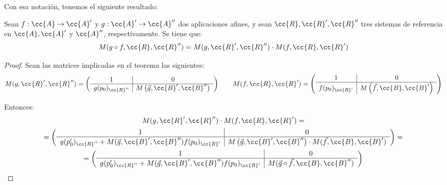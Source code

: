 Con esa notación, tenemos el siguiente resultado:
\begin{teo}
    Sean $f:\cc{A}\to \cc{A}'$ y $g:\cc{A}'\to \cc{A}''$ dos aplicaciones afines, y sean $\cc{R}, \cc{R}', \cc{R}''$ tres sistemas de referencia en $\cc{A},\cc{A}'$ y $\cc{A}''$, respectivamente. Se tiene que:
    \begin{equation*}
        M(g\circ f, \cc{R}, \cc{R}'')
        = M(g,\cc{R}', \cc{R}'')\cdot
        M(f,\cc{R}, \cc{R}')
    \end{equation*}
\end{teo}
\begin{proof}
    Sean las matrices implicadas en el teorema las siguientes:
    \begin{equation*}
        M(g,\cc{R}',\cc{R}'')=\left(\begin{array}{c|c}
            1 & 0 \\ \hline
            g(p_0)_{\cc{R}''} &  M\left(\vec{g},\cc{B}',\cc{B}''\right)  \\
        \end{array}\right)\qquad
        M(f,\cc{R},\cc{R}')=\left(\begin{array}{c|c}
            1 & 0 \\ \hline
            f(p_0)_{\cc{R}'} &  M\left(\vec{f},\cc{B},\cc{B}'\right)  \\
        \end{array}\right)
    \end{equation*}

    Entonces:
    \begin{multline*}
        M(g,\cc{R}', \cc{R}'')\cdot
        M(f,\cc{R}, \cc{R}') =\\=
        \left(\begin{array}{c|c}
            1 & 0 \\ \hline
            g(p_0')_{\cc{R}''} + M(\vec{g},\cc{B}',\cc{B}'')f(p_0)_{\cc{R}'} &  M\left(\vec{g},\cc{B}',\cc{B}''\right)\cdot M(\vec{f},\cc{B},\cc{B}')  \\
        \end{array}\right)=\\
        = \left(\begin{array}{c|c}
            1 & 0 \\ \hline
            g(p_0')_{\cc{R}''} + M(\vec{g},\cc{B}',\cc{B}'')f(p_0)_{\cc{R}'} &  M(\vec{g}\circ \vec{f},\cc{B},\cc{B}'')  \\
        \end{array}\right)
    \end{multline*}


\end{proof}
